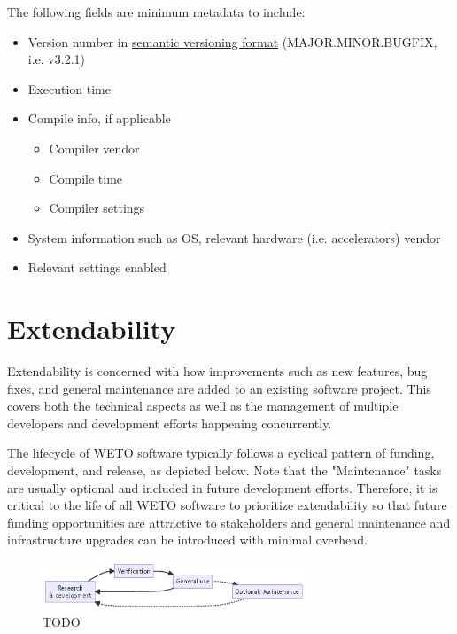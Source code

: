 \documentclass[]{nrel}
\begin{document}
The following fields are minimum metadata to include:
\begin{itemize}
\item Version number in \href{https://semver.org}{semantic versioning format} (MAJOR.MINOR.BUGFIX, i.e. v3.2.1)

\item Execution time

\item Compile info, if applicable
\begin{itemize}
\item Compiler vendor

\item Compile time

\item Compiler settings

\end{itemize}

\item System information such as OS, relevant hardware (i.e. accelerators) vendor

\item Relevant settings enabled

\end{itemize}


\chapter{Extendability}
\label{sec:extendability}
Extendability is concerned with how improvements such as new features, bug fixes, and general
maintenance are added to an existing software project. This covers both the technical aspects
as well as the management of multiple developers and development efforts happening
concurrently.

The lifecycle of WETO software typically follows a cyclical pattern of funding, development, and
release, as depicted below. Note that the "Maintenance" tasks are usually optional and included
in future development efforts. Therefore, it is critical to the life of all WETO software to
prioritize extendability so that future funding opportunities are attractive to stakeholders
and general maintenance and infrastructure upgrades can be introduced with minimal overhead.

\begin{figure}[htbp] \begin{center}
\includegraphics[width=0.7\textwidth]{mermaid-d1bafe392e85b8f467e3d93074dc8d7b7c45dfd0.png}
\caption{TODO}
\label{fig:fig2} \end{center} \end{figure}
\end{document}

